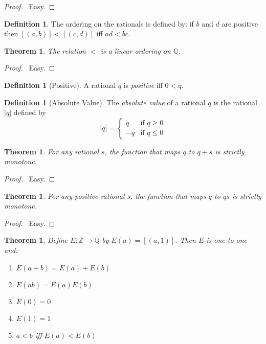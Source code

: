 \documentclass{article}
\let\qed\relax
\newtheorem{theorem}[axiom]{Theorem}
\theoremstyle{definition}
\newtheorem{definition}[axiom]{Definition}
\begin{document}
    \begin{proof}
        \pf\ Easy.
    \end{proof}

    \begin{definition}
        The ordering on the rationals is defined by: if $b$ and $d$ are positive then
        $[(a,b)] < [(c,d)]$ iff $ad < bc$.
    \end{definition}

    \begin{theorem}
        The relation $<$ is a linear ordering on $\mathbb{Q}$.
    \end{theorem}

    \begin{proof}
        \pf\ Easy. \qed
    \end{proof}

    \begin{definition}[Positive]
        A rational $q$ is \emph{positive} iff $0 < q$.
    \end{definition}

    \begin{definition}[Absolute Value]
        The \emph{absolute value} of a rational $q$ is the rational $|q|$ defined by
        \[ |q| = \begin{cases}
            q & \text{if } q \geq 0 \\
            -q & \text{if } q \leq 0
        \end{cases} \]
    \end{definition}

    \begin{theorem}
        For any rational $s$, the function that maps $q$ to $q + s$ is strictly monotone.
    \end{theorem}
    
    \begin{proof}
        \pf\ Easy. \qed
    \end{proof}

    \begin{theorem}
        For any positive rational $s$, the function that maps $q$ to $qs$ is strictly monotone.
    \end{theorem}

    \begin{proof}
        \pf\ Easy. \qed
    \end{proof}

    \begin{theorem}
        Define $E : \mathbb{Z} \rightarrow \mathbb{Q}$ by $E(a) = [(a,1)]$. Then $E$ is one-to-one and:
        \begin{enumerate}
            \item $E(a+b) = E(a) + E(b)$
            \item $E(ab) = E(a)E(b)$
            \item $E(0) = 0$
            \item $E(1) = 1$
            \item $a < b$ iff $E(a) < E(b)$
        \end{enumerate}
    \end{theorem}
\end{document}
